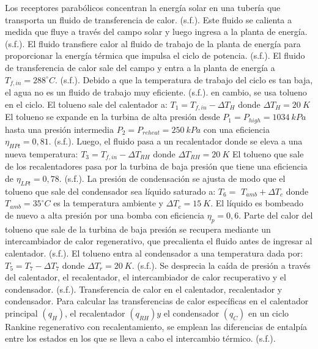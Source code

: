 \documentclass{beamer}
\begin{document}
\begin{frame}
\begin{thebibliography}{9}
         Los receptores parabólicos concentran la energía solar en una tubería que transporta un fluido de transferencia de calor. (s.f.). 
         Este fluido se calienta a medida que fluye a través del campo solar y luego ingresa a la planta de energía. (s.f.). 
         El fluido transfiere calor al fluido de trabajo de la planta de energía para proporcionar la energía térmica que impulsa el ciclo de potencia. (s.f.). 
         El fluido de transferencia de calor sale del campo y entra a la planta de energía a $T_{f,in}=288^{\circ}C$. (s.f.). 
         Debido a que la temperatura de trabajo del ciclo es tan baja, el agua no es un fluido de trabajo muy eficiente. (s.f.). 
         en cambio, se usa tolueno en el ciclo. El tolueno sale del calentador a: $T_{1}=T_{f,in}-\Delta T_{H}$ donde $\Delta T_{H}=20~K$ El tolueno se expande en la turbina de alta presión desde $P_{1}=P_{high}=1034~kPa$ hasta una presión intermedia $P_{2}=P_{reheat}=250~kPa$ con una eficiencia $\eta_{HPt}=0,81$. (s.f.). 
         Luego, el fluido pasa a un recalentador donde se eleva a una nueva temperatura: $T_{3}=T_{f,in}-\Delta T_{RH}$ donde $\Delta T_{RH}=20~K$ El tolueno que sale de los recalentadores pasa por la turbina de baja presión que tiene una eficiencia de $\eta_{LPt}=0,78$. (s.f.). 
         La presión de condensación se ajusta de modo que el tolueno que sale del condensador sea líquido saturado a: $T_{6}=$ $T_{amb}+\Delta T_{c}$ donde $T_{amb}=35^{\circ}C$ es la temperatura ambiente y $\Delta T_{c}=15~K.$ El líquido es bombeado de nuevo a alta presión por una bomba con eficiencia $\eta_{p}=0,6$. Parte del calor del tolueno que sale de la turbina de baja presión se recupera mediante un intercambiador de calor regenerativo, que precalienta el fluido antes de ingresar al calentador. (s.f.). 
         El tolueno entra al condensador a una temperatura dada por: $T_{5}=T_{7}-\Delta T_{7}$ donde $\Delta T_{r}=20~K$. (s.f.). 
         Se desprecia la caída de presión a través del calentador, el recalentador, el intercambiador de calor recuperativo y el condensador. (s.f.). 
         Transferencia de calor en el calentador, recalentador y condensador. Para calcular las transferencias de calor específicas en el calentador principal $(q_{H})$, el recalentador $(q_{RH})y$ el condensador $(q_{C})$ en un ciclo Rankine regenerativo con recalentamiento, se emplean las diferencias de entalpía entre los estados en los que se lleva a cabo el intercambio térmico. (s.f.). 

\end{thebibliography}
\end{frame}
\end{document}
